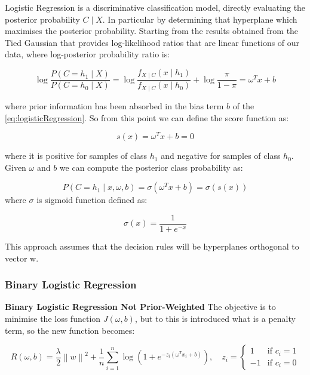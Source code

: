 
Logistic Regression is a discriminative classification model, directly evaluating the posterior probability \(C \mid X\).
In particular by determining that hyperplane which maximises the posterior probability.
Starting from the results obtained from the Tied Gaussian that provides log-likelihood ratios that are linear functions
of our data, where log-posterior probability ratio is:

\begin{equation}
    \log \frac{P(C=h_1 \mid X)}{P(C=h_0 \mid X)} = \log \frac{f_{X \mid C}(x \mid h_1)}{f_{X \mid C}(x \mid h_0)} + \log \frac{\pi}{1-\pi} = \omega^T x + b
    \label{eq:logisticRegression}
\end{equation}

where prior information has been absorbed in the bias term \(b\) of the \autoref{eq:logisticRegression}.
So from this point we can define the score function as:

\begin{equation}
    s(x) = \omega^T x + b = 0
    \label{eq:scoreFunctionLR}
\end{equation}

where it is positive for samples of class \(h_1\) and negative for samples of class \(h_0\).
Given \(\omega\) and \(b\) we can compute the posterior class probability as:

\begin{equation}
    P(C=h_1 \mid x, \omega, b) = \sigma(\omega^T x + b) = \sigma(s(x))
    \label{eq:posteriorClassProbabilityLR}
\end{equation}
where \(\sigma\) is sigmoid function defined as:

\begin{equation}
    \sigma(x) = \frac{1}{1 + e^{-x}}
\end{equation}

This approach assumes that the decision rules will be hyperplanes orthogonal to vector w.

\subsubsection{Binary Logistic Regression}
\textbf{Binary Logistic Regression Not Prior-Weighted}\n
The objective is to minimise the loss function \(J(\omega,b)\), but to this is introduced what is a penalty term,
so the new function becomes:

\begin{equation}
    R(\omega,b) = \frac{\lambda}{2}\left\|w \right\|^2 + \frac{1}{n} \sum_{i=1}^{n} \log (1+e^{-z_i(\omega^T x_i + b)}), \quad
    z_i = \begin{cases}
              1 & \text{if } c_i = 1 \\
              -1 & \text{if } c_i = 0
    \end{cases}
    \label{eq:minimiseFunctionLR}
\end{equation}

